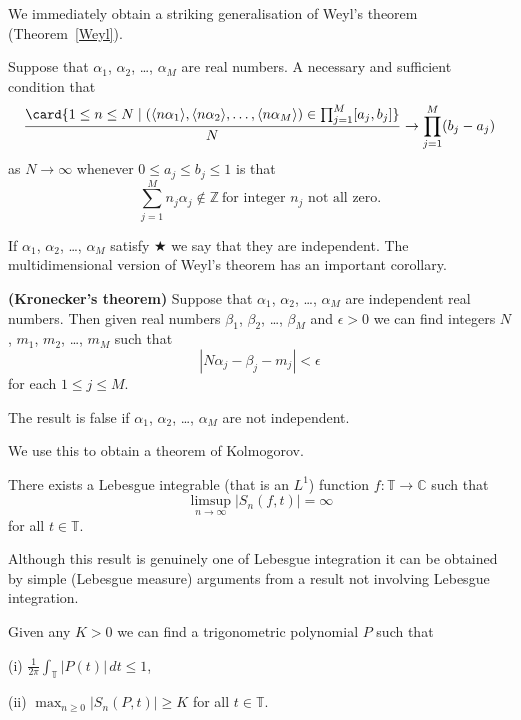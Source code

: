 We immediately obtain a striking generalisation of
Weyl's theorem (Theorem~\ref{Weyl}).
\begin{theorem}\label{Weyl many} Suppose
that $\alpha_{1}$, $\alpha_{2}$, \dots, $\alpha_{M}$
are real numbers. A necessary and sufficient condition
that
\[\frac{\card\{1\leq n\leq N \mid
(\langle n\alpha_{1}\rangle,\langle n\alpha_{2}\rangle,
\dots,\langle n\alpha_{M}\rangle)
\in \prod_{j=1}^{M}[a_{j},b_{j}]\}}{N}
\rightarrow \prod_{j=1}^{M}(b_{j}-a_{j})\]
as $N\rightarrow\infty$ whenever $0\leq a_{j}\leq b_{j}\leq 1$
is that
\begin{equation*}
\sum_{j=1}^{M} n_{j}\alpha_{j}\notin{\mathbb Z}
\ \text{for integer $n_{j}$ not all zero}. \tag*{$\bigstar$}
\end{equation*}
\end{theorem}
If $\alpha_{1}$, $\alpha_{2}$, \dots, $\alpha_{M}$
satisfy $\bigstar$ we say that they are independent.
The multidimensional version of Weyl's theorem has
an important corollary.
\begin{theorem}{\bf (Kronecker's theorem)}\label{Kronecker's theorem}
Suppose
that $\alpha_{1}$, $\alpha_{2}$, \dots, $\alpha_{M}$
are independent real numbers. Then given real
numbers $\beta_{1}$, $\beta_{2}$, \dots, $\beta_{M}$
and $\epsilon>0$ we can find integers
$N$, $m_{1}$, $m_{2}$, \dots, $m_{M}$ such that
\[|N\alpha_{j}-\beta_{j}-m_{j}|<\epsilon\]
for each $1\leq j\leq M$.

The result is false if
$\alpha_{1}$, $\alpha_{2}$, \dots, $\alpha_{M}$
are not independent.
\end{theorem}

We use this to obtain a theorem of Kolmogorov.
\begin{theorem} There exists a Lebesgue integrable
(that is an $L^{1}$) function
$f:{\mathbb T}\rightarrow{\mathbb C}$ such that
\[\limsup_{n\rightarrow\infty}|S_{n}(f,t)|=\infty\]
for all $t\in{\mathbb T}$.
\end{theorem}
Although this result is genuinely one of
Lebesgue integration it can be obtained
by simple (Lebesgue measure) arguments
from a result not involving Lebesgue integration.
\begin{lemma}\label{Polynomial Kolmogorov}
Given any $K>0$ we can find a
trigonometric polynomial $P$ such that

(i) ${\displaystyle \frac{1}{2\pi}\int_{\mathbb T}|P(t)|\, dt\leq 1}$,

(ii) $\max_{n\geq 0}|S_{n}(P,t)|\geq K$
for all $t\in{\mathbb T}$.
\end{lemma}

